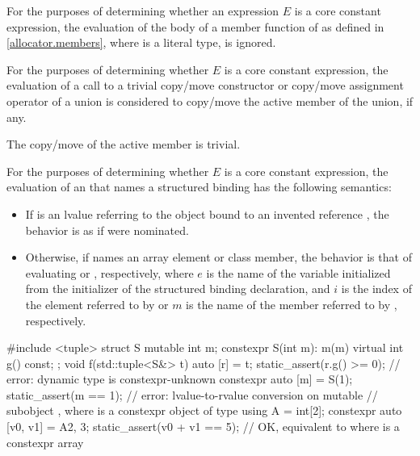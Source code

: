 \pnum
For the purposes of determining
whether an expression $E$ is a core constant expression,
the evaluation of the body of a member function of 
as defined in \ref{allocator.members}, where  is a literal type,
is ignored.

\pnum
For the purposes of determining whether $E$ is a core constant expression,
the evaluation of a call to
a trivial copy/move constructor or copy/move assignment operator of a union
is considered to copy/move the active member of the union, if any.
\begin{note}
The copy/move of the active member is trivial.
\end{note}

\pnum
For the purposes of determining whether $E$ is a core constant expression,
the evaluation of an 
that names a structured binding  has the
following semantics:
\begin{itemize}
\item
If  is an lvalue referring to the object bound to an invented reference ,
the behavior is as if  were nominated.
\item
Otherwise, if  names an array element or class member,
the behavior is that of
evaluating  or , respectively,
where $e$ is the name of the variable
initialized from the initializer of the structured binding declaration, and
$i$ is the index of the element referred to by  or
$m$ is the name of the member referred to by , respectively.
\end{itemize}
\begin{example}
\begin{codeblock}
#include <tuple>
struct S {
  mutable int m;
  constexpr S(int m): m(m) {}
  virtual int g() const;
};
void f(std::tuple<S&> t) {
  auto [r] = t;
  static_assert(r.g() >= 0);            // error: dynamic type is constexpr-unknown
  constexpr auto [m] = S(1);
  static_assert(m == 1);                // error: lvalue-to-rvalue conversion on mutable
                                        // subobject , where  is a constexpr object of type 
  using A = int[2];
  constexpr auto [v0, v1] = A{2, 3};
  static_assert(v0 + v1 == 5);          // OK, equivalent to  where  is a constexpr array
}
\end{codeblock}
\end{example}

